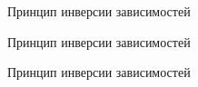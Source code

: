 \documentclass[10pt,pdf,hyperref={unicode}]{beamer}%
\begin{document}
\begin{frame}{Принцип инверсии зависимостей}
\begin{figure}[h]
\end{figure}
\end{frame}


\begin{frame}{Принцип инверсии зависимостей}
\begin{figure}[h]
\end{figure}
\end{frame}


\begin{frame}{Принцип инверсии зависимостей}
\begin{figure}[h]
\end{figure}
\end{frame}
\end{document}
